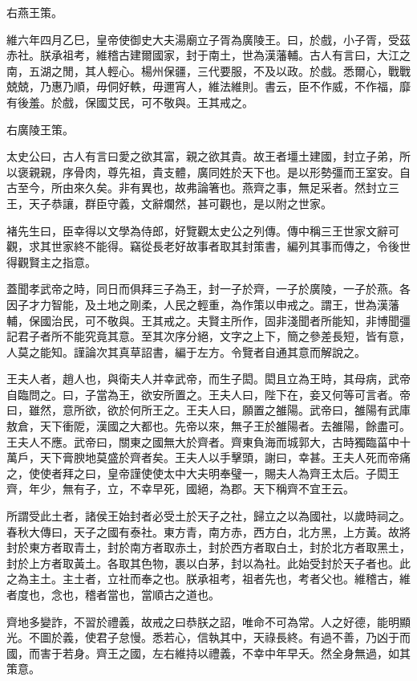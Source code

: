 右燕王策。

維六年四月乙巳，皇帝使御史大夫湯廟立子胥為廣陵王。曰，於戲，小子胥，受茲赤社。朕承祖考，維稽古建爾國家，封于南土，世為漢藩輔。古人有言曰，大江之南，五湖之閒，其人輕心。楊州保疆，三代要服，不及以政。於戲。悉爾心，戰戰兢兢，乃惠乃順，毋侗好軼，毋邇宵人，維法維則。書云，臣不作威，不作福，靡有後羞。於戲，保國艾民，可不敬與。王其戒之。

右廣陵王策。

太史公曰，古人有言曰愛之欲其富，親之欲其貴。故王者壃土建國，封立子弟，所以褒親親，序骨肉，尊先祖，貴支體，廣同姓於天下也。是以形勢彊而王室安。自古至今，所由來久矣。非有異也，故弗論箸也。燕齊之事，無足采者。然封立三王，天子恭讓，群臣守義，文辭爛然，甚可觀也，是以附之世家。

褚先生曰，臣幸得以文學為侍郎，好覽觀太史公之列傳。傳中稱三王世家文辭可觀，求其世家終不能得。竊從長老好故事者取其封策書，編列其事而傳之，令後世得觀賢主之指意。

蓋聞孝武帝之時，同日而俱拜三子為王，封一子於齊，一子於廣陵，一子於燕。各因子才力智能，及土地之剛柔，人民之輕重，為作策以申戒之。謂王，世為漢藩輔，保國治民，可不敬與。王其戒之。夫賢主所作，固非淺聞者所能知，非博聞彊記君子者所不能究竟其意。至其次序分絕，文字之上下，簡之參差長短，皆有意，人莫之能知。謹論次其真草詔書，編于左方。令覽者自通其意而解說之。

王夫人者，趙人也，與衛夫人并幸武帝，而生子閎。閎且立為王時，其母病，武帝自臨問之。曰，子當為王，欲安所置之。王夫人曰，陛下在，妾又何等可言者。帝曰，雖然，意所欲，欲於何所王之。王夫人曰，願置之雒陽。武帝曰，雒陽有武庫敖倉，天下衝阸，漢國之大都也。先帝以來，無子王於雒陽者。去雒陽，餘盡可。王夫人不應。武帝曰，關東之國無大於齊者。齊東負海而城郭大，古時獨臨菑中十萬戶，天下膏腴地莫盛於齊者矣。王夫人以手擊頭，謝曰，幸甚。王夫人死而帝痛之，使使者拜之曰，皇帝謹使使太中大夫明奉璧一，賜夫人為齊王太后。子閎王齊，年少，無有子，立，不幸早死，國絕，為郡。天下稱齊不宜王云。

所謂受此土者，諸侯王始封者必受土於天子之社，歸立之以為國社，以歲時祠之。春秋大傳曰，天子之國有泰社。東方青，南方赤，西方白，北方黑，上方黃。故將封於東方者取青土，封於南方者取赤土，封於西方者取白土，封於北方者取黑土，封於上方者取黃土。各取其色物，裹以白茅，封以為社。此始受封於天子者也。此之為主土。主土者，立社而奉之也。朕承祖考，祖者先也，考者父也。維稽古，維者度也，念也，稽者當也，當順古之道也。

齊地多變詐，不習於禮義，故戒之曰恭朕之詔，唯命不可為常。人之好德，能明顯光。不圖於義，使君子怠慢。悉若心，信執其中，天祿長終。有過不善，乃凶于而國，而害于若身。齊王之國，左右維持以禮義，不幸中年早夭。然全身無過，如其策意。

